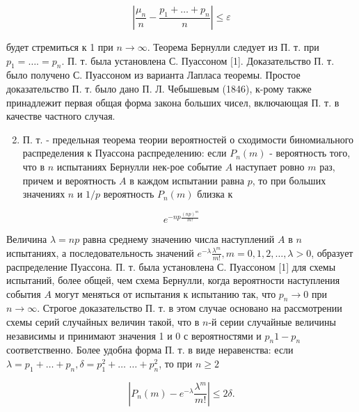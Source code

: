 \documentclass[10pt]{article}
\begin{document}
\[

\left|\frac{\mu_{n}}{n}-\frac{p_{1}+\ldots+p_{n}}{n}\right| \leqslant \varepsilon

\]



будет стремиться к 1 при $n \rightarrow \infty$. Теорема Бернулли следует из П. т. при $p_{1}=\ldots .=p_{n}$. П. т. была установлена С. Пуассоном [1]. Доказательство П. т. было получено С. Пуассоном из варианта Лапласа теоремы. Простое доказательство П. т. было дано П. Л. Чебышевым (1846), к-рому также принадлежит первая общая форма закона больших чисел, включающая П. т. в качестве частного случая.



\begin{enumerate}

  \setcounter{enumi}{1}

  \item П. т. - предельная теорема теории вероятностей о сходимости биномиального распределения к Пуассона распределению: если $P_{n}(m)$ - вероятность того, что в $n$ испытаниях Бернулли нек-рое событие $A$ наступает ровно $m$ раз, причем и вероятность $A$ в каждом испытании равна $p$, то при больших значениях $n$ и $1 / p$ вероятность $P_{n}(m)$ близка к

\end{enumerate}



\[

e^{-n p \frac{(n p)^{m}}{m !}}

\]



Величина $\lambda=n p$ равна среднему значению числа наступлений $A$ в $n$ испытаниях, а последовательность значений $e^{-\lambda} \frac{\lambda^{m}}{m !}, m=0,1,2, \ldots, \lambda>0$, образует распределение Пуассона. П. т. была установлена С. Пуассоном [1] для схемы испытаний, более общей, чем схема Бернулли, когда вероятности наступления события $A$ могут меняться от испытания к испытанию так, что $p_{n} \rightarrow 0$ при $n \rightarrow \infty$. Строгое доказательство П. т. в этом случае основано на рассмотрении схемы серий случайных величин такой, что в $n$-й серии случайные величины независимы и принимают значения 1 и 0 с вероятностями и $p_{n} 1-p_{n}$ соответственно. Более удобна форма П. т. в виде неравенства: если $\lambda=p_{1}+\ldots+p_{n}, \delta=p_{1}^{2}+\ldots$ $\ldots+p_{n}^{2}$, то при $n \geqslant 2$



\[

\left|P_{n}(m)-e^{-\lambda} \frac{\lambda^{m}}{m !}\right| \leqslant 2 \delta .

\]
\end{document}
